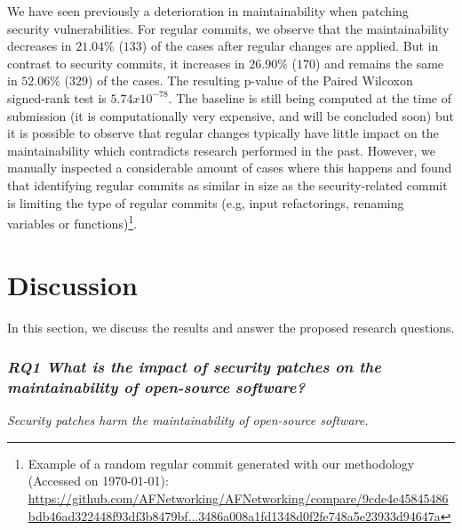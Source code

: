 \documentclass[10pt,conference]{IEEEtran}
\begin{document}
We have seen previously a deterioration in maintainability when patching security vulnerabilities. 
For regular commits, we observe that the maintainability decreases in $21.04\%$ ($133$) 
of the cases after regular changes are applied. But in contrast
to security commits, it increases in $26.90\%$ ($170$) 
and remains the same in $52.06\%$ ($329$) 
of the cases. The resulting p-value of the Paired Wilcoxon signed-rank
test is $5.74x10^{-78}$. The baseline is still being computed at the time of submission (it is computationally very expensive, and will be concluded soon) but it is possible to observe 
that regular changes typically have little impact on the maintainability which contradicts research performed in the past. However,
we manually inspected a considerable amount of cases where this happens and
found that identifying regular commits as similar in size as the security-related commit is limiting the type of regular commits (e.g, input refactorings, renaming variables or functions)\footnote{Example of a random regular commit generated with our methodology (Accessed on \today{}):
\url{https://github.com/AFNetworking/AFNetworking/compare/9cde4e45845486bdb46ad322448f93df3b8479bf...3486a008a1fd1348d0f2fe748a5e23933d94647a}}.




\section{Discussion}\label{sec:discussion}

In this section, we discuss the results and answer the proposed research questions.

\subsubsection*{\textit{\textbf{RQ1} \textbf{What is the impact of security patches on the maintainability
of open-source software?}}}


\textit{Security patches harm the maintainability of open-source software.}
\end{document}
